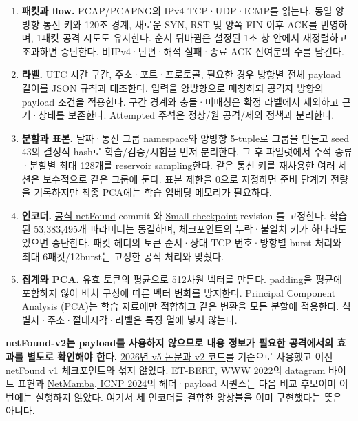 \begin{enumerate}[leftmargin=*,itemsep=3pt]
\item \textbf{패킷과 flow.} PCAP/PCAPNG의 IPv4 TCP·UDP·ICMP를 읽는다. 동일 양방향 통신 키와 120초 경계, 새로운 SYN, RST 및 양쪽 FIN 이후 ACK를 반영하며, 1패킷 공격 시도도 유지한다. 순서 뒤바뀜은 설정된 1초 창 안에서 재정렬하고 초과하면 중단한다. 비IPv4·단편·해석 실패·종료 ACK 잔여분의 수를 남긴다.
\item \textbf{라벨.} UTC 시간 구간, 주소·포트·프로토콜, 필요한 경우 방향별 전체 payload 길이를 JSON 규칙과 대조한다. 입력을 양방향으로 매칭하되 공격자 방향의 payload 조건을 적용한다. 구간 경계와 충돌·미매칭은 확정 라벨에서 제외하고 근거·상태를 보존한다. Attempted 주석은 정상/원 공격/제외 정책과 분리한다.
\item \textbf{분할과 표본.} 날짜·통신 그룹 namespace와 양방향 5-tuple로 그룹을 만들고 seed 43의 결정적 hash로 학습/검증/시험을 먼저 분리한다. 그 후 파일럿에서 주석 종류·분할별 최대 128개를 reservoir sampling한다. 같은 통신 키를 재사용한 여러 세션은 보수적으로 같은 그룹에 둔다. 표본 제한을 0으로 지정하면 준비 단계가 전량을 기록하지만 최종 PCA에는 학습 임베딩 메모리가 필요하다.
\item \textbf{인코더.} \href{https://github.com/SNL-UCSB/netFound}{공식 netFound} commit 와 \href{https://huggingface.co/snlucsb/netFound-small}{Small checkpoint} revision 를 고정한다. 학습된 53,383,495개 파라미터는 동결하며, 체크포인트의 누락·불일치 키가 하나라도 있으면 중단한다. 패킷 헤더의 토큰 순서·상대 TCP 번호·방향별 burst 처리와 최대 6패킷/12burst는 고정한 공식 처리와 맞췄다.
\item \textbf{집계와 PCA.} 유효 토큰의 평균으로 512차원 벡터를 만든다. padding을 평균에 포함하지 않아 배치 구성에 따른 벡터 변화를 방지한다. Principal Component Analysis (PCA)는 학습 자료에만 적합하고 같은 변환을 모든 분할에 적용한다. 식별자·주소·절대시각·라벨은 특징 열에 넣지 않는다.
\end{enumerate}

\textbf{netFound-v2는 payload를 사용하지 않으므로 내용 정보가 필요한 공격에서의 효과를 별도로 확인해야 한다.} \href{https://arxiv.org/abs/2310.17025v5}{2026년 v5 논문과 v2 코드}를 기준으로 사용했고 이전 netFound v1 체크포인트와 섞지 않았다. \href{https://arxiv.org/abs/2202.06335}{ET-BERT, WWW 2022}의 datagram 바이트 표현과 \href{https://github.com/wangtz19/NetMamba}{NetMamba, ICNP 2024}의 헤더·payload 시퀀스는 다음 비교 후보이며 이번에는 실행하지 않았다. 여기서 세 인코더를 결합한 앙상블을 이미 구현했다는 뜻은 아니다.

